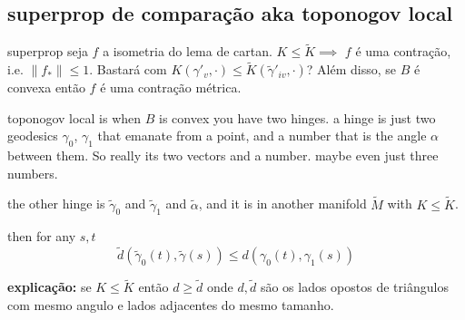 \subsection{superprop de comparação aka toponogov local}

\begin{thing6}{superprop}\leavevmode
seja \(f\) a isometria do lema de cartan. \(K \leq  \tilde{K} \implies \) \(f\) é uma contração, i.e. \(\|f_*\|\leq  1\). Bastará com \(K(\gamma'_v,\cdot)\leq \tilde{K}(\tilde{\gamma}'_{iv},\cdot)\)? Além disso, se \(B\) é convexa então \(f\) é uma contração métrica.
\end{thing6}

\begin{thing7}{toponogov local is when \(B\) is convex}\leavevmode
you have two hinges. a hinge is just two geodesics \(\gamma_0\), \(\gamma_1\) that emanate from a point, and a number that is the angle \(\alpha\) between them. So really its two vectors and a number. maybe even just  three numbers.

the other hinge is \(\tilde{\gamma}_0\) and \(\tilde{\gamma}_1\) and \(\tilde{\alpha}\), and it is in another manifold \(\tilde{M}\) with \(K \leq  \tilde{K}\).

then for any \(s,t\) 
\[\tilde{d}(\tilde{\gamma}_0(t),\tilde{\gamma}(s)) \leq d(\gamma_0(t),\gamma_1(s))\]
\end{thing7}

\textbf{explicação:} se \(K \leq  \tilde{K}\) então \(d \geq \tilde{d}\) onde \(d,\tilde{d}\) são os lados opostos de triângulos com mesmo angulo e lados adjacentes do mesmo tamanho.


